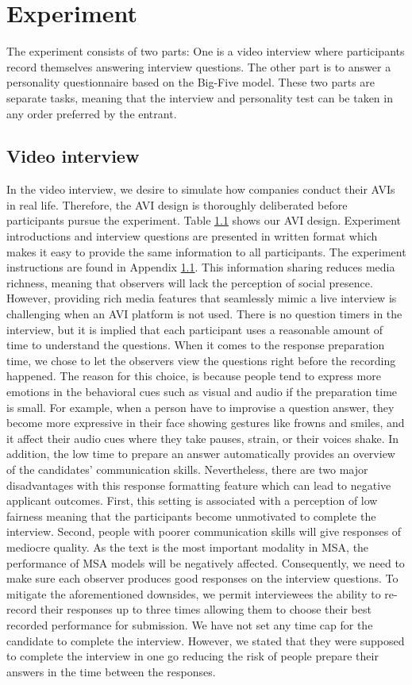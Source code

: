 \section{Experiment}
The experiment consists of two parts: One is a video interview where participants record themselves answering interview questions. The other part is to answer a personality questionnaire based on the Big-Five model. These two parts are separate tasks, meaning that the interview and personality test can be taken in any order preferred by the entrant. 

\subsection{Video interview}
In the video interview, we desire to simulate how companies conduct their AVIs in real life. Therefore, the AVI design is thoroughly deliberated before participants pursue the experiment. Table \ref{} shows our AVI design. Experiment introductions and interview questions are presented in written format which makes it easy to provide the same information to all participants. The experiment instructions are found in Appendix \ref{}. This information sharing reduces media richness, meaning that observers will lack the perception of social presence. However, providing rich media features that seamlessly mimic a live interview is challenging when an AVI platform is not used. There is no question timers in the interview, but it is implied that each participant uses a reasonable amount of time to understand the questions. When it comes to the response preparation time, we chose to let the observers view the questions right before the recording happened. The reason for this choice, is because people tend to express more emotions in the behavioral cues such as visual and audio if the preparation time is small. For example, when a person have to improvise a question answer, they become more expressive in their face showing gestures like frowns and smiles, and it affect their audio cues where they take pauses, strain, or their voices shake. In addition, the low time to prepare an answer automatically provides an overview of the candidates' communication skills. Nevertheless, there are two major disadvantages with this response formatting feature which can lead to negative applicant outcomes. First, this setting is associated with a perception of low fairness meaning that the participants become unmotivated to complete the interview. Second, people with poorer communication skills will give responses of mediocre quality. As the text is the most important modality in MSA, the performance of MSA models will be negatively affected. Consequently, we need to make sure each observer produces good responses on the interview questions. To mitigate the aforementioned downsides, we permit interviewees the ability to re-record their responses up to three times allowing them to choose their best recorded performance for submission. We have not set any time cap for the candidate to complete the interview. However, we stated that they were supposed to complete the interview in one go reducing the risk of people prepare their answers in the time between the responses. 
